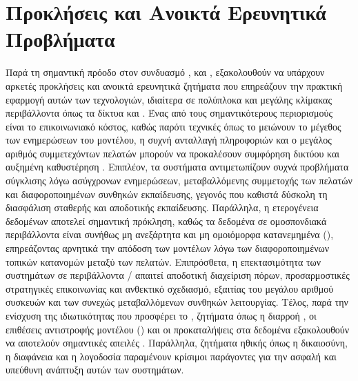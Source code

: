 \section{Προκλήσεις και Ανοικτά Ερευνητικά Προβλήματα}

Παρά τη σημαντική πρόοδο στον συνδυασμό ,  και , εξακολουθούν να υπάρχουν αρκετές προκλήσεις και ανοικτά ερευνητικά ζητήματα που επηρεάζουν την πρακτική εφαρμογή αυτών των τεχνολογιών, ιδιαίτερα σε πολύπλοκα και μεγάλης κλίμακας περιβάλλοντα όπως τα δίκτυα  και . Ένας από τους σημαντικότερους περιορισμούς είναι το επικοινωνιακό κόστος, καθώς παρότι τεχνικές όπως το  μειώνουν το μέγεθος των ενημερώσεων του μοντέλου, η συχνή ανταλλαγή πληροφοριών και ο μεγάλος αριθμός συμμετεχόντων πελατών μπορούν να προκαλέσουν συμφόρηση δικτύου και αυξημένη καθυστέρηση \cite{kairouz2021advances}. Επιπλέον, τα συστήματα  αντιμετωπίζουν συχνά προβλήματα σύγκλισης λόγω ασύγχρονων ενημερώσεων, μεταβαλλόμενης συμμετοχής των πελατών και διαφοροποιημένων συνθηκών εκπαίδευσης, γεγονός που καθιστά δύσκολη τη διασφάλιση σταθερής και αποδοτικής εκπαίδευσης. Παράλληλα, η ετερογένεια δεδομένων αποτελεί σημαντική πρόκληση, καθώς τα δεδομένα σε ομοσπονδιακά περιβάλλοντα είναι συνήθως μη ανεξάρτητα και μη ομοιόμορφα κατανεμημένα (), επηρεάζοντας αρνητικά την απόδοση των μοντέλων λόγω των διαφοροποιημένων τοπικών κατανομών μεταξύ των πελατών. Επιπρόσθετα, η επεκτασιμότητα των συστημάτων σε περιβάλλοντα / απαιτεί αποδοτική διαχείριση πόρων, προσαρμοστικές στρατηγικές επικοινωνίας και ανθεκτικό σχεδιασμό, εξαιτίας του μεγάλου αριθμού συσκευών και των συνεχώς μεταβαλλόμενων συνθηκών λειτουργίας. Τέλος, παρά την ενίσχυση της ιδιωτικότητας που προσφέρει το , ζητήματα όπως η διαρροή , οι επιθέσεις αντιστροφής μοντέλου () και οι προκαταλήψεις στα δεδομένα εξακολουθούν να αποτελούν σημαντικές απειλές \cite{zhu2019deep}. Παράλληλα, ζητήματα ηθικής όπως η δικαιοσύνη, η διαφάνεια και η λογοδοσία παραμένουν κρίσιμοι παράγοντες για την ασφαλή και υπεύθυνη ανάπτυξη αυτών των συστημάτων.
